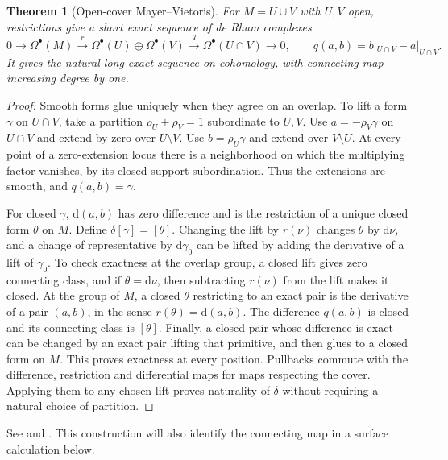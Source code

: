 \documentclass[11pt,oneside,openany]{book}
\newtheorem{theorem}{Theorem}[chapter]
\theoremstyle{definition}
\theoremstyle{remark}
\newcommand{\dd}{\mathrm d}
\begin{document}
\begin{theorem}[Open-cover Mayer--Vietoris]
\label{p104:M11.03}
For \(M=U\cup V\) with \(U,V\) open, restrictions give a short exact
sequence of de Rham complexes
\[
 0\longrightarrow\Omega^\bullet(M)\xrightarrow{r}
 \Omega^\bullet(U)\oplus\Omega^\bullet(V)\xrightarrow{q}
 \Omega^\bullet(U\cap V)\longrightarrow0,\qquad
 q(a,b)=b|_{U\cap V}-a|_{U\cap V}.
\]
It gives the natural long exact sequence on cohomology, with
connecting map increasing degree by one.
\end{theorem}
\begin{proof}
Smooth forms glue uniquely when they agree on an overlap. To
lift a form \(\gamma\) on \(U\cap V\), take a partition
\(\rho_U+\rho_V=1\) subordinate to \(U,V\). Use
\(a=-\rho_V\gamma\) on \(U\cap V\) and extend by zero over \(U\setminus V\).
Use \(b=\rho_U\gamma\) and extend over \(V\setminus U\). At every
point of a zero-extension locus there is a neighborhood on which
the multiplying factor vanishes, by its closed support
subordination. Thus the extensions are smooth, and \(q(a,b)=\gamma\).

For closed \(\gamma\), \(\dd(a,b)\) has zero difference and is the
restriction of a unique closed form \(\theta\) on \(M\).
Define \(\delta[\gamma]=[\theta]\). Changing the lift by \(r(\nu)\)
changes \(\theta\) by \(\dd\nu\), and a change of representative by
\(\dd\gamma_0\) can be lifted by adding the derivative of a lift of
\(\gamma_0\). To check exactness at the overlap group, a closed
lift gives zero connecting class, and if \(\theta=\dd\nu\), then
subtracting \(r(\nu)\) from the lift makes it closed. At the group
of \(M\), a closed \(\theta\) restricting to an exact pair is the
derivative of a pair \((a,b)\), in the sense \(r(\theta)=\dd(a,b)\).
The difference \(q(a,b)\) is closed and its connecting class is
\([\theta]\). Finally, a closed pair whose difference is exact
can be changed by an exact pair lifting that primitive, and
then glues to a closed form on \(M\). This proves exactness
at every position. Pullbacks commute with the difference, restriction
and differential maps for maps respecting the cover. Applying
them to any chosen lift proves naturality of \(\delta\) without
requiring a natural choice of partition.
\end{proof}
See \cite[pp.~448--451, 460--464]{lee} and \cite[\S\S25--26]{tu}.
This construction will also identify the connecting map in a
surface calculation below.
\end{document}
